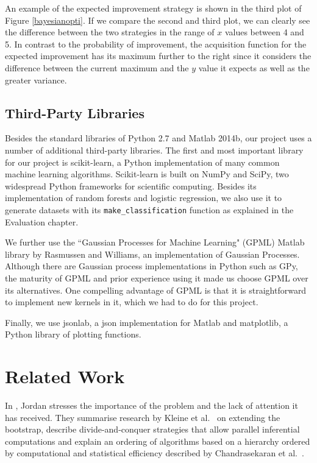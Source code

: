 \documentclass[a4paper,12pt,twoside,openright]{report}
\begin{document}
An example of the expected improvement strategy is shown in the third plot of Figure \ref{bayesianopti}. If we compare the second and third plot, we can clearly see the difference between the two strategies in the range of $x$ values between 4 and 5. In contrast to the probability of improvement, the acquisition function for the expected improvement has its maximum further to the right since it considers the difference between the current maximum and the $y$ value it expects as well as the greater variance.

\section{Third-Party Libraries}
Besides the standard libraries of Python 2.7 and Matlab 2014b, our project uses a number of additional third-party libraries. The first and most important library for our project is scikit-learn, a Python implementation of many common machine learning algorithms. Scikit-learn is built on NumPy and SciPy, two widespread Python frameworks for scientific computing. Besides its implementation of random forests and logistic regression, we also use it to generate datasets with its \texttt{make\_classification} function as explained in the Evaluation chapter.

We further use the ``Gaussian Processes for Machine Learning" (GPML) Matlab library by Rasmussen and Williams, an implementation of Gaussian Processes. Although there are Gaussian process implementations in Python such as GPy, the maturity of GPML and prior experience using it made us choose GPML over its alternatives. One compelling advantage of GPML is that it is straightforward to implement new kernels in it, which we had to do for this project.

Finally, we use jsonlab, a json implementation for Matlab and matplotlib, a Python library of plotting functions.



\chapter{Related Work}
In \cite{jordan2013}, Jordan stresses the importance of the problem and the lack of attention it has received. They summarise research by Kleine et al.\ \cite{RSSB:RSSB12050} on extending the bootstrap, describe divide-and-conquer strategies that allow parallel inferential computations and explain an ordering of algorithms based on a hierarchy ordered by computational and statistical efficiency described by Chandrasekaran et al.\ \cite{Chandrasekaran26032013}.
\end{document}
